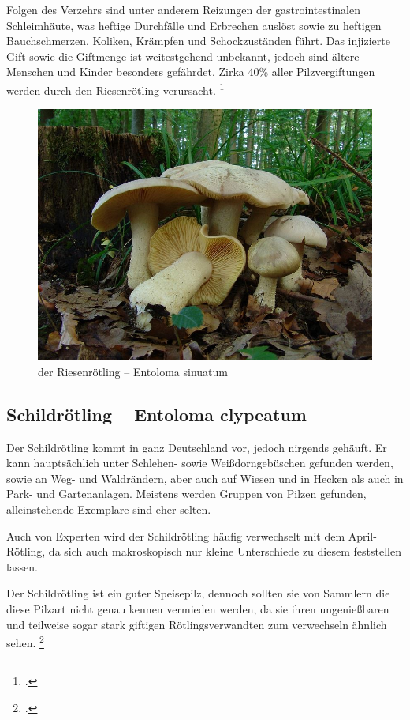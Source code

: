 \documentclass[a4paper,abstracton]{scrreprt}
\begin{document}
Folgen des Verzehrs sind unter anderem Reizungen der gastrointestinalen Schleimhäute, was heftige Durchfälle und Erbrechen auslöst sowie zu heftigen Bauchschmerzen, Koliken, Krämpfen und Schockzuständen führt. Das injizierte Gift sowie die Giftmenge ist weitestgehend unbekannt, jedoch sind ältere Menschen und Kinder besonders gefährdet. Zirka 40\% aller Pilzvergiftungen werden durch den Riesenrötling verursacht.
\footcite{riesenroetling}

\begin{figure}[H]
\centering
\includegraphics[scale=0.2]{riesenroetling}
\caption{der Riesenrötling -- Entoloma sinuatum }
\label{fig:riesenroetling}
\end{figure}

\subsection{Schildrötling -- Entoloma clypeatum}
\label{ref:schildroet}
Der Schildrötling kommt in ganz Deutschland vor, jedoch nirgends gehäuft. Er kann hauptsächlich unter Schlehen- sowie Weißdorngebüschen gefunden werden, sowie an Weg- und Waldrändern, aber auch auf Wiesen und in Hecken als auch in Park- und Gartenanlagen. Meistens werden Gruppen von Pilzen gefunden, alleinstehende Exemplare sind eher selten. 

Auch von Experten wird der Schildrötling häufig verwechselt mit dem April-Rötling, da sich auch makroskopisch nur kleine Unterschiede zu diesem feststellen lassen.

Der Schildrötling ist ein guter Speisepilz, dennoch sollten sie von Sammlern die diese Pilzart nicht genau kennen vermieden werden, da sie ihren ungenießbaren und teilweise sogar stark giftigen Rötlingsverwandten zum verwechseln ähnlich sehen.
\footcite{schildroetling}
\end{document}
